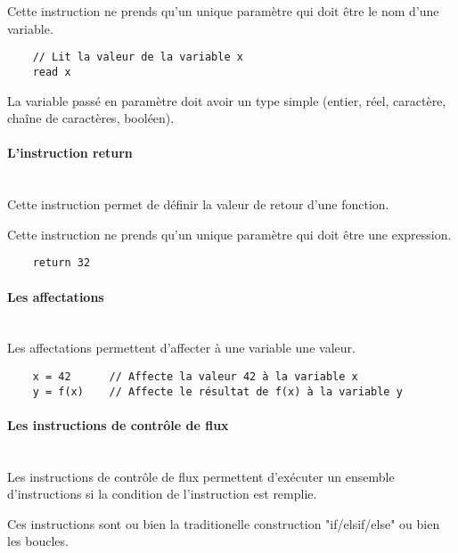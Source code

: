 Cette instruction ne prends qu'un unique paramètre qui doit être le nom d'une
variable.

\begin{verbatim}
    // Lit la valeur de la variable x
    read x
\end{verbatim}

La variable passé en paramètre doit avoir un type simple (entier, réel,
caractère, chaîne de caractères, booléen).


\paragraph{L'instruction return}\mbox{} \\

Cette instruction permet de définir la valeur de retour d'une fonction.

Cette instruction ne prends qu'un unique paramètre qui doit être une
expression.


\begin{verbatim}
    return 32
\end{verbatim}


\paragraph{Les affectations}\mbox{} \\

Les affectations permettent d'affecter à une variable une valeur.

\begin{verbatim}
    x = 42      // Affecte la valeur 42 à la variable x
    y = f(x)    // Affecte le résultat de f(x) à la variable y
\end{verbatim}


\paragraph{Les instructions de contrôle de flux}\mbox{} \\

Les instructions de contrôle de flux permettent d'exécuter un ensemble
d'instructions si la condition de l'instruction est remplie.

Ces instructions sont ou bien la traditionelle construction "if/elsif/else" ou
bien les boucles.


